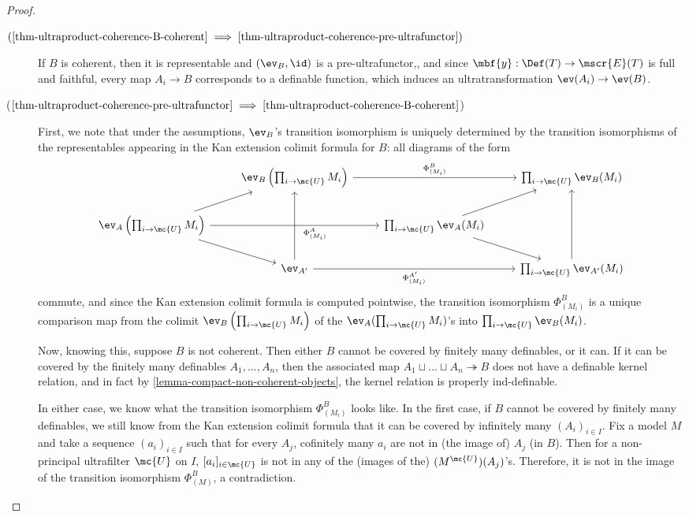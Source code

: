   \begin{proof}
    \begin{description}
\item[$(\ref{thm-ultraproduct-coherence-B-coherent} \implies \ref{thm-ultraproduct-coherence-pre-ultrafunctor})$] If $B$ is coherent, then it is representable and $(\ev_B, \id)$ is a pre-ultrafunctor,, and since $\mbf{y} : \Def(T) \to \mscr{E}(T)$ is full and faithful, every map $A_i \to B$ corresponds to a definable function, which induces an ultratransformation $\ev(A_i) \to \ev(B)$.

    \item[($\ref{thm-ultraproduct-coherence-pre-ultrafunctor} \implies \ref{thm-ultraproduct-coherence-B-coherent}$)] First, we note that under the assumptions, $\ev_B$'s transition isomorphism is uniquely determined by the transition isomorphisms of the representables appearing in the Kan extension colimit formula for $B$: all diagrams of the form
      $$
      \begin{tikzcd}[ampersand replacement=\&]
\&    \ev_B \left(\prod_{i \to \mc{U}} M_i \right) \arrow{rr}{\Phi^B_{(M_i)}} \& \& \prod_{i \to \mc{U}} \ev_B(M_i) \\
        \ev_A\left(\prod_{i \to \mc{U}} M_i \right) \arrow[swap]{rr}{\hspace{13mm} \Phi^A_{(M_i)}} \arrow{ur} \arrow{dr}  \& \& \prod_{i \to \mc{U}} \ev_A(M_i) \arrow{ur} \arrow{dr} \& \\
        \& \ev_{A'} \arrow[swap]{rr}{\Phi^{A'}_{(M_i)}} \arrow{uu} \& \& \prod_{i \to \mc{U}} \ev_{A'} (M_i) \arrow{uu}
        \end{tikzcd}
      $$
      commute, and since the Kan extension colimit formula is computed pointwise, the transition isomorphism $\Phi^B_{(M_i)}$ is a unique comparison map from the colimit $\ev_B \left(\prod_{i \to \mc{U}} M_i \right)$ of the $\ev_A(\prod_{i \to \mc{U}} M_i)$'s into $\prod_{i \to \mc{U}} \ev_B(M_i)$.

      Now, knowing this, suppose $B$ is not coherent. Then either $B$ cannot be covered by finitely many definables, or it can. If it can be covered by the finitely many definables $A_1, \dots, A_n$, then the associated map $A_1 \sqcup \dots \sqcup A_n \twoheadrightarrow B$ does not have a definable kernel relation, and in fact by \ref{lemma-compact-non-coherent-objects}, the kernel relation is properly ind-definable.

      In either case, we know what the transition isomorphism $\Phi^B_{(M_i)}$ looks like. In the first case, if $B$ cannot be covered by finitely many definables, we still know from the Kan extension colimit formula that it can be covered by infinitely many $(A_i)_{i \in I}$. Fix a model $M$ and take a sequence $(a_i)_{i \in I}$ such that for every $A_j$, cofinitely many $a_i$ are not in (the image of) $A_j$ (in $B$). Then for a non-principal ultrafilter $\mc{U}$ on $I$, $[a_i]_{i \in \mc{U}}$ is not in any of the (images of the) $(M^{\mc{U}})(A_j)$'s. Therefore, it is not in the image of the transition isomorphism $\Phi^B_{(M)}$, a contradiction.


\end{description}
\end{proof}

